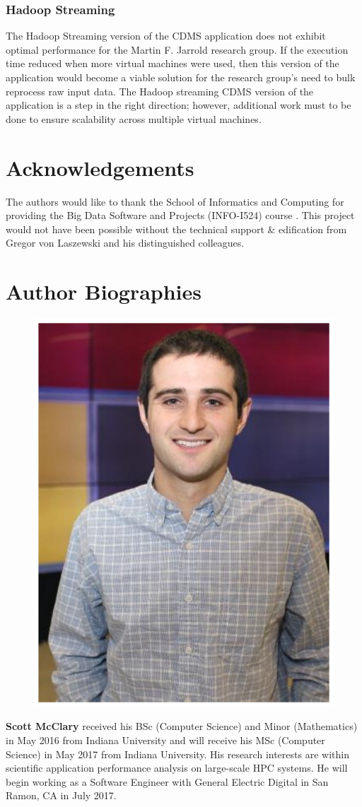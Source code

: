\documentclass[9pt,twocolumn,twoside]{../../styles/osajnl}
\begin{document}
\subsubsection{Hadoop Streaming}
The Hadoop Streaming version of the CDMS application does not exhibit
optimal performance for the Martin F. Jarrold research group. If the
execution time reduced when more virtual machines were used, then this
version of the application would become a viable solution for the
research group's need to bulk reprocess raw input data. The Hadoop
streaming CDMS version of the application is a step in the right
direction; however, additional work must to be done to ensure
scalability across multiple virtual machines.

\section*{Acknowledgements}
The authors would like to thank the School of Informatics and
Computing for providing the Big Data Software and Projects (INFO-I524)
course \cite{www-i524}. This project would not have been possible
without the technical support \& edification from Gregor von Laszewski
and his distinguished colleagues.

 
\section*{Author Biographies}
\begingroup
\setlength\intextsep{0pt}
\begin{minipage}[t][3.2cm][t]{1.0\columnwidth} 
  \begin{figure}
    \includegraphics[width=0.25\columnwidth]{images/scott_mcclary}
  \end{figure}
  \noindent
  {\bfseries Scott McClary} received his BSc (Computer Science) and
  Minor (Mathematics) in May 2016 from Indiana University and will
  receive his MSc (Computer Science) in May 2017 from Indiana
  University. His research interests are within scientific application
  performance analysis on large-scale HPC systems. He will begin
  working as a Software Engineer with General Electric Digital in San
  Ramon, CA in July 2017.
\end{minipage}
\endgroup
\end{document}
